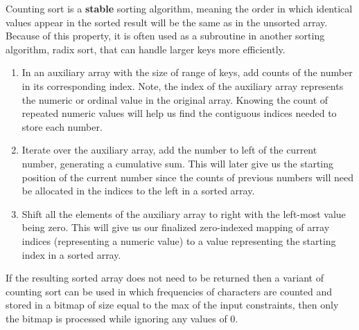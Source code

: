 \documentclass{article}
\begin{document}
     Counting sort is a \textbf{stable} sorting algorithm, meaning the order in which identical values appear in the sorted result will be the same as in the unsorted array. Because of this property, it is often used as a subroutine in another sorting algorithm, radix sort, that can handle larger keys more efficiently.
   
    \begin{enumerate}
        \item In an auxiliary array with the size of range of keys, add counts of the number in its corresponding index. Note, the index of the auxiliary array represents the numeric or ordinal value in the original array. Knowing the count of repeated numeric values will help us find the contiguous indices needed to store each number. 
        \item Iterate over the auxiliary array, add the number to left of the current number, generating a cumulative sum. This will later give us the starting position of the current number since the counts of previous numbers will need be allocated in the indices to the left in a sorted array.
        \item Shift all the elements of the auxiliary array to right with the left-most value being zero. This will give us our finalized zero-indexed mapping of array indices (representing a numeric value) to a value representing the starting index in a sorted array.
    \end{enumerate}
    
    If the resulting sorted array does not need to be returned then a variant of counting sort can be used in which frequencies of characters are counted and stored in a bitmap of size equal to the max of the input constraints, then only the bitmap is processed while ignoring any values of 0.
\end{document}

